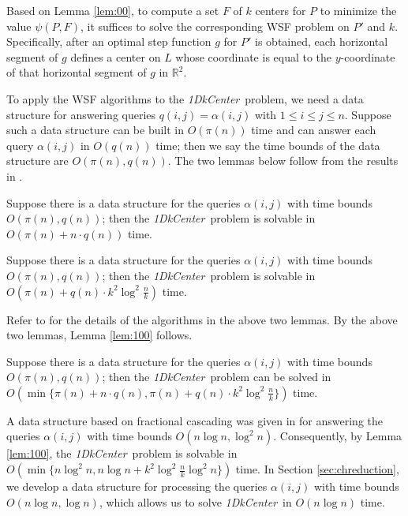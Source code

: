 \documentclass{llncs}
\def\calR{\mathbb{R}^2}
\def\problem{{\it 1DkCenter}}
\begin{document}
Based on Lemma \ref{lem:00}, to compute a set $F$ of $k$ centers for
$P$ to minimize the value $\psi(P,F)$, it suffices to solve the
corresponding WSF problem on $P'$ and $k$. Specifically, after an
optimal step function $g$ for $P'$ is obtained, each horizontal
segment of $g$ defines a center on $L$ whose coordinate is equal to
the $y$-coordinate of that horizontal segment of $g$ in $\calR$.

To apply the WSF algorithms to the \problem\ problem, we need a data
structure for answering queries $q(i,j)=\alpha(i,j)$ with $1\leq i\leq
j\leq n$. Suppose such a data structure can be built in $O(\pi(n))$
time and can answer each query $\alpha(i,j)$ in $O(q(n))$ time; then we
say the time bounds of the data structure are $O(\pi(n),q(n))$. The two
lemmas below follow from the results in \cite{ref:ChenAp091}.




\begin{lemma}\label{lem:10}{\em \cite{ref:ChenAp091}} Suppose
there is a data structure for the queries $\alpha(i,j)$ with time
bounds $O(\pi(n),q(n))$; then the \problem\ problem is solvable
in $O(\pi(n)+n\cdot q(n))$ time.
\end{lemma}

\begin{lemma}\label{lem:20}{\em \cite{ref:ChenAp091}} Suppose
there is a data structure for the queries $\alpha(i,j)$ with time
bounds $O(\pi(n),q(n))$; then the \problem\ problem is solvable
in $O(\pi(n)+q(n)\cdot k^2\log^2\frac{n}{k})$ time.
\end{lemma}

Refer to \cite{ref:ChenAp091} for the details of the algorithms in the
above two lemmas.
By the above two lemmas, Lemma \ref{lem:100} follows.

\begin{lemma}\label{lem:100} Suppose
there is a data structure for the queries $\alpha(i,j)$ with time
bounds $O(\pi(n),q(n))$; then the \problem\ problem can be solved
in $O(\min\{\pi(n)+n\cdot q(n),\pi(n)+q(n)\cdot k^2\log^2\frac{n}{k}\})$ time.
\end{lemma}





A data structure based on fractional cascading \cite{ref:ChazelleFr86} was given in
\cite{ref:ChenAp091} for answering the
queries $\alpha(i,j)$ with time bounds $O(n\log n,\log^2 n)$. Consequently, by
Lemma \ref{lem:100}, the \problem\ problem is
solvable in $O(\min\{n\log^2 n, n\log n+ k^2\log^2\frac{n}{k}\log^2
n\})$ time. In Section \ref{sec:chreduction}, we develop a data
structure for processing the queries $\alpha(i,j)$ with time bounds
$O(n\log n, \log n)$, which allows us to solve \problem\
in $O(n\log n)$ time.
\end{document}
